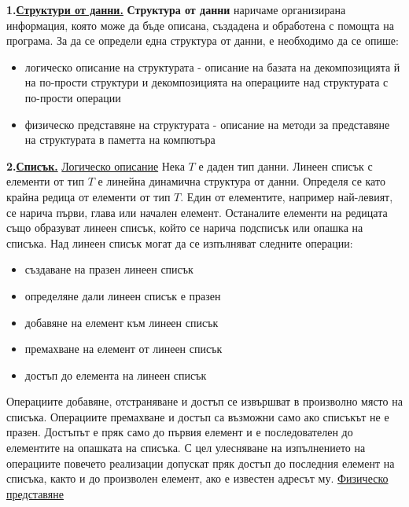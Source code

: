 \documentclass{article}
\begin{document}
\textbf{1.\underline{Структури от данни.}} \newline\newline
\textbf{Структура от данни} наричаме организирана информация, която може да бъде описана, създадена и обработена с помощта на
програма. За да се определи една структура от данни, е необходимо да се опише:
\begin{itemize}
    \item логическо описание на структурата - описание на базата на декомпозицията й на по-прости структури и декомпозицията на
    операциите над структурата с по-прости операции
    \item физическо представяне на структурата - описание на методи за представяне на структурата в паметта на компютъра
\end{itemize}
\textbf{2.\underline{Списък.}} \newline\newline
\underline{Логическо описание} \newline
Нека $T$ е даден тип данни. Линеен списък с елементи от тип $T$ е линейна динамична структура от данни. Определя се като крайна
редица от елементи от тип $T$. Един от елементите, например най-левият, се нарича първи, глава или начален елемент. Останалите
елементи на редицата също образуват линеен списък, който се нарича подсписък или опашка на списъка. Над линеен списък могат да се
изпълняват следните операции:\newline
\begin{itemize}
    \item създаване на празен линеен списък
    \item определяне дали линеен списък е празен
    \item добавяне на елемент към линеен списък
    \item премахване на елемент от линеен списък
    \item достъп до елемента на линеен списък
\end{itemize}
Операциите добавяне, отстраняване и достъп се извършват в произволно място на списъка. Операциите премахване и достъп са възможни
само ако списъкът не е празен. Достъпът е пряк само до първия елемент и е последователен до елементите на опашката на списъка.
С цел улесняване на изпълнението на операциите повечето реализации допускат пряк достъп до последния елемент на списъка, както и
до произволен елемент, ако е известен адресът му. \newline\newline
\underline{Физическо представяне} \newline
\end{document}
